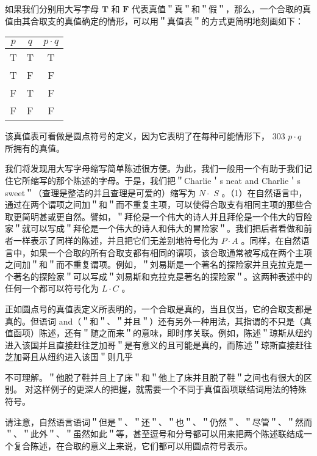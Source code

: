 如果我们分别用大写字母 $\mathbf{T}$ 和 $\mathbf{F}$ 代表真值＂真＂和＂假＂，那么，一个合取的真值由其合取支的真值确定的情形，可以用＂真值表＂的方式更简明地刻画如下：

\begin{center}
\begin{tabular}{|ccc|}
\hline
$p$ & $q$ & $p \cdot q$ \\
\hline
T & T & T \\
T & F & F \\
F & T & F \\
F & F & F \\
\hline
\end{tabular}
\end{center}

该真值表可看做是圆点符号的定义，因为它表明了在每种可能情形下， 303 $p \cdot q$ 所拥有的真值。

我们将发现用大写字母缩写简单陈述很方便。为此，我们一般用一个有助于我们记住它所缩写的那个陈述的字母。于是，我们把＂Charlie＇s neat and Charlie＇s sweet＂（查理是整洁的并且查理是可爱的）缩写为 $N \cdot$ $S$ 。（1）在自然语言中，通过在两个谓项之间加＂和＂而不重复主项，可以使得合取支有相同主项的那些合取更简明甚或更自然。譬如，＂拜伦是一个伟大的诗人并且拜伦是一个伟大的冒险家＂就可以写成＂拜伦是一个伟大的诗人和伟大的冒险家＂。我们把后者看做和前者一样表示了同样的陈述，并且把它们无差别地符号化为 $P \cdot A$ 。同样，在自然语言中，如果一个合取的所有合取支都有相同的谓项，该合取通常被写成在两个主项之间加＂和＂而不重复谓项。例如，＂刘易斯是一个著名的探险家并且克拉克是一个著名的探险家＂可以写成＂刘易斯和克拉克是著名的探险家＂。这两种表述中的任何一个都可以符号化为 $L \cdot C$ 。

正如圆点号的真值表定义所表明的，一个合取是真的，当且仅当，它的合取支都是真的。但语词 and（＂和＂、＂并且＂）还有另外一种用法，其指谓的不只是（真值函项）陈述，还有＂随之而来＂的意味，即时序关联。例如，陈述＂琼斯从纽约进入该国并且直接赶往芝加哥＂是有意义的且可能是真的，而陈述＂琼斯直接赶往芝加哥且从纽约进入该国＂则几乎

不可理解。＂他脱了鞋并且上了床＂和＂他上了床并且脱了鞋＂之间也有很大的区别。\cite{grice1975} 对这样例子的更深人的把握，就需要一个不同于真值函项联结词用法的特殊符号。

请注意，自然语言语词＂但是＂、＂还＂、＂也＂、＂仍然＂、＂尽管＂、＂然而＂、＂此外＂、＂虽然如此＂等，甚至逗号和分号都可以用来把两个陈述联结成一个复合陈述，在合取的意义上来说，它们都可以用圆点符号表示。

